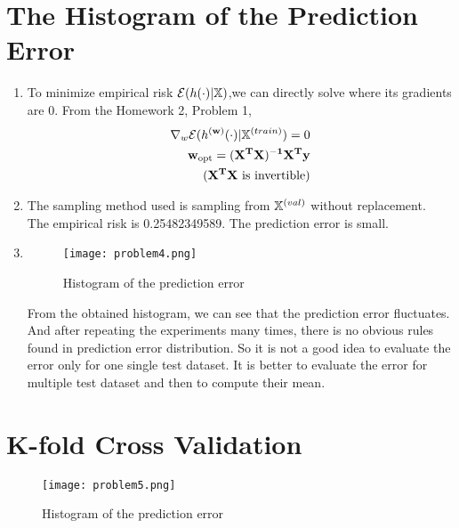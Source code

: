 \documentclass[article,11pt]{article}
\begin{document}
\newpage
\section{The Histogram of the Prediction Error}  
\begin{enumerate}
\item 
To minimize empirical risk $\mathcal{E}(h(\cdot) | \mathbb{X})$,we can directly solve
where its gradients are 0. From the Homework 2, Problem 1,
\begin{equation}
\begin{aligned}
\nabla_{w}\mathcal{E}(h^{({\bf w})}(\cdot) | \mathbb{X}^{(train)})=0 \\
{\bf w}_{\rm opt}=(\bf{X}^{T}\bf{X})^{-1}\bf{X}^{T}{\bf y}\\
(\bf{X}^{T}\bf{X} \text{ is invertible})
\end{aligned}
\end{equation}
\item The sampling method used is sampling from $\mathbb{X}^{(val)}$ without replacement.\\ 
The empirical risk is 0.25482349589. The prediction error is small.
\item 
\begin{figure}[H]
	\begin{center}
		\texttt{[image: problem4.png]}
	\end{center}
	\caption{Histogram of the prediction error}
\end{figure}
From the obtained histogram, we can see that the prediction error fluctuates. And after repeating the experiments many times, there is no obvious rules found in prediction error distribution. So it is not a good idea to evaluate the error only for one single test dataset. It is better to evaluate the error for multiple test dataset and then to compute their mean.
\end{enumerate}
\newpage
\section{K-fold Cross Validation}
\begin{figure}[H]
	\begin{center}
		\texttt{[image: problem5.png]}
	\end{center}
	\caption{Histogram of the prediction error}
\end{figure}
\end{document}
